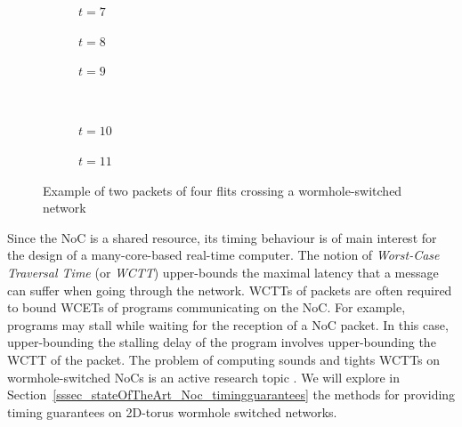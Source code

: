\documentclass[main.tex]{subfiles}
\begin{document}
\begin{example}
\begin{figure}
    \vspace{10mm}


    \begin{subfigure}[b]{0.3\linewidth}
    \centering
        \scalebox{0.25}{}
        \caption{$t=7$}
    \end{subfigure}
     \hspace{5mm}
    \begin{subfigure}[b]{0.3\linewidth}
    \centering
        \scalebox{0.25}{}
        \caption{$t=8$}
    \end{subfigure}
     \hspace{5mm}
    \begin{subfigure}[b]{0.3\linewidth}
    \centering
        \scalebox{0.25}{}
        \caption{$t=9$}
    \end{subfigure} \\


    \vspace{10mm}

    \begin{subfigure}[b]{0.3\linewidth}
    \centering
        \scalebox{0.25}{}
        \caption{$t=10$}
    \end{subfigure}
     \hspace{1cm}
    \begin{subfigure}[b]{0.3\linewidth}
    \centering
        \scalebox{0.25}{}
        \caption{$t=11$}
    \end{subfigure}

    \caption{Example of two packets of four flits crossing a wormhole-switched network}
    \label{fig_stateOfTheArt_exampleWormhole}

\end{figure}

\end{example}

    Since the NoC is a shared resource, its timing behaviour is of main interest for the design of a many-core-based real-time computer. The notion of \emph{Worst-Case Traversal Time} (or \emph{WCTT}) upper-bounds the maximal latency that a message can suffer when going through the network. WCTTs of packets are often required to bound WCETs of programs communicating on the NoC. For example, programs may stall while waiting for the reception of a NoC packet. In this case, upper-bounding the stalling delay of the program involves upper-bounding the WCTT of the packet. The problem of computing sounds and tights WCTTs on wormhole-switched NoCs is an active research topic \cite{Lu2005, Qian2010, Dinechin2014, Giannopoulou2015}. We will explore in Section~\ref{sssec_stateOfTheArt_Noc_timingguarantees} the methods for providing timing guarantees on 2D-torus wormhole switched networks. %
\end{document}
